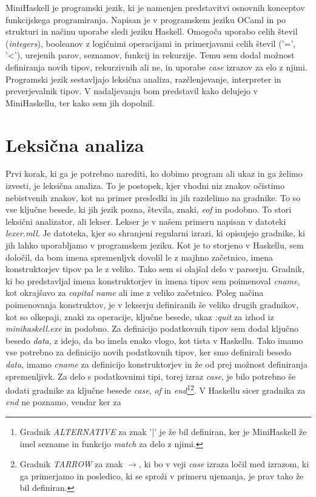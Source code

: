 \documentclass[12pt,a4paper,openany]{book}
\begin{document}
MiniHaskell je programski jezik, ki je namenjen predstavitvi osnovnih konceptov funkcijskega programiranja. Napisan je v programskem jeziku 
OCaml in po strukturi in načinu uporabe sledi jeziku Haskell. Omogoča uporabo celih števil (\textit{integers}), booleanov z logičnimi operacijami in primerjavami 
celih števil ('=', '<'), urejenih parov, seznamov, funkcij in rekurzije. Temu sem dodal možnost definiranja novih tipov, rekurzivnih ali ne, in 
uporabe \emph{case} izrazov za elo z njimi. Programski jezik sestavljajo leksična analiza, razčlenjevanje, interpreter in preverjevalnik tipov. V nadaljevanju bom predstavil kako 
delujejo v MiniHaskellu, ter kako sem jih dopolnil.

\section{Leksična analiza}
Prvi korak, ki ga je potrebno narediti, ko dobimo program ali ukaz in ga želimo izvesti, je leksična analiza. To je postopek, kjer vhodni niz znakov očistimo nebistvenih znakov, kot 
na primer presledki in jih razdelimo na gradnike. To so vse ključne besede, ki jih jezik pozna, števila, znaki, \emph{eof} in podobno. To stori leksični analizator, ali lekser. 
Lekser je v našem primeru napisan v datoteki \emph{lexer.mll}. Je datoteka, kjer so shranjeni regularni izrazi, ki opisujejo gradnike, ki jih lahko uporabljamo v programskem jeziku. 
Kot je to storjeno v Haskellu, sem določil, da bom imena spremenljvk dovolil le z majhno začetnico, imena konstruktorjev tipov pa le z veliko. Tako sem si olajšal delo v parserju. 
Gradnik, ki bo predstavljal imena konstruktorjev in imena tipov sem poimenoval \emph{cname}, kot okrajšavo za \textit{capital name} ali ime z veliko začetnico. Poleg načina poimenovanja 
konstruktov, je v lekserju definiranih še veliko drugih gradnikov, kot so olkepaji, znaki za operacije, ključne besede, ukaz \emph{:quit} za izhod iz \emph{minihaskell.exe} 
in podobno. Za definicijo podatkovnih tipov sem dodal ključno besedo \emph{data}, z idejo, da bo imela enako vlogo, kot tista v Haskellu. Tako imamo vse potrebno za 
definicijo novih podatkovnih tipov, ker smo definirali besedo \emph{data}, imamo \emph{cname} za definicijo konstruktorjev in že od prej možnost definiranja spremenljivk.
Za delo s podatkovnimi tipi, torej izraz \emph{case}, je bilo potrebno še dodati gradnike za ključne besede \emph{case}, \emph{of} in \emph{end}\footnote{Gradnik \emph{ALTERNATIVE} 
za znak '|' je že bil definiran, ker je MiniHaskell že imel sezname in funkcijo \emph{match} za delo z njimi.}\footnote{Gradnik \emph{TARROW} za znak \emph{$\rightarrow$}, ki bo v veji \emph{case} 
izraza ločil med izrazom, ki ga primerjamo in posledico, ki se sproži v primeru ujemanja, je prav tako že bil definiran.}. V Haskellu sicer gradnika za \emph{end} ne poznamo, vendar ker za 
\end{document}
